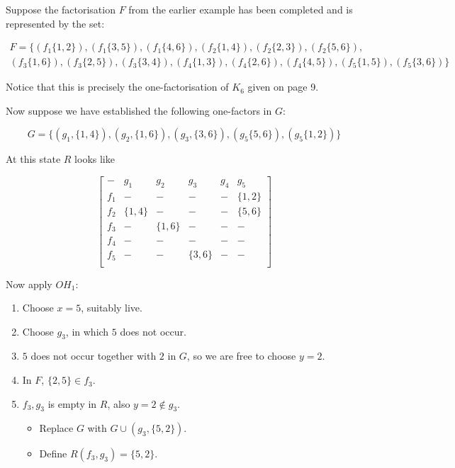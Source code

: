 \documentclass[
  11pt,
  a4paper]{book}
\newcounter{example}
\begin{document}
\begin{example}
Suppose the factorisation $F$ from the earlier example has
been completed and is represented by the set:

\begin{equation}
  \begin{split}
    F = \{(f_1\{1,2\}),(f_1\{3,5\}),(f_1\{4,6\}),(f_2\{1,4\}),(f_2\{2,3\}),(f_2\{5,6\}), \\
    (f_3\{1,6\}),(f_3\{2,5\}),(f_3\{3,4\}),(f_4\{1,3\}),(f_4\{2,6\}),(f_4\{4,5\}),(f_5\{1,5\}),(f_5\{3,6\})\}
  \end{split}
\end{equation}

Notice that this is precisely the one-factorisation of $K_6$
given on page 9.

Now suppose we have established the following one-factors in
$G$:

\begin{equation}
  G = \{(g_1, \{1, 4\}), (g_2, \{1, 6\}), (g_3, \{3, 6\}), (g_5\{5, 6\}), (g_5\{1, 2\})\}
\end{equation}

At this state $R$ looks like 

\begin{equation}
  \begin{bmatrix}
     -  &   g_1    &    g_2    &    g_3   & g_4 &    g_5    \\
    f_1 &     -    &     -     &    -     &  -  & \{1, 2\}  \\
    f_2 & \{1, 4\} &     -     &    -     &  -  & \{5, 6\}  \\
    f_3 &     -    &  \{1, 6\} &    -     &  -  &     -     \\
    f_4 &     -    &     -     &    -     &  -  &     -     \\
    f_5 &     -    &     -     & \{3, 6\} &  -  &     -     \\
  \end{bmatrix}
\end{equation}

Now apply $OH_1$:

\begin{enumerate}
  \item{Choose $x = 5$, suitably live.}
  \item{Choose $g_3$, in which $5$ does not occur.}
  \item{$5$ does not occur together with $2$ in $G$, so we are
     free to choose $y = 2$.}
  \item{In $F$, $\{2, 5\} \in f_3$.}
  \item{
    $f_3, g_3$ is empty in $R$, also $y = 2 \notin g_3$.
    \begin{itemize}
       \item{Replace $G$ with $G \cup (g_3, \{5, 2\})$.}
       \item{Define $R(f_3, g_3) = \{5, 2\}$.}
    \end{itemize}
  }
\end{enumerate}


\end{example}
\end{document}
